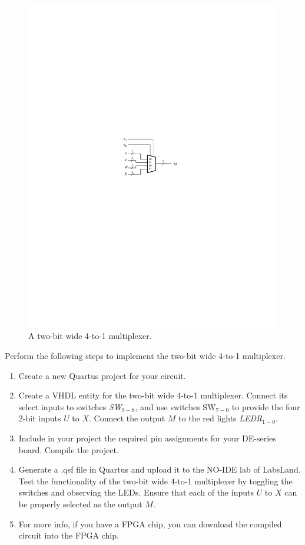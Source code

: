 \documentclass[epsfig,10pt,fullpage]{article}
\begin{document}
\begin{figure}[H]
	\begin{center}
		\includegraphics[]{figures/figure5.pdf}
	\end{center}
\caption{A two-bit wide 4-to-1 multiplexer.}
\label{fig:5}
\end{figure}

Perform the following steps to implement the two-bit wide 4-to-1 multiplexer.
\begin{enumerate}
\item Create a new Quartus project for your circuit.
\item Create a VHDL entity for the two-bit wide 4-to-1 multiplexer. Connect its select
inputs to switches {\it SW}$_{9-8}$, and use switches SW$_{7-0}$ to
provide the four 2-bit inputs $U$ to $X$. Connect the 
output $M$ to the red lights {\it LEDR}$_{1-0}$.
\item Include in your project the required pin assignments for your DE-series board.
Compile the project.
\item Generate a .qsf file in Quartus and upload it to the NO-IDE lab of LabsLand. Test the functionality of the 
two-bit wide 4-to-1 multiplexer by toggling the switches and observing the LEDs. Ensure
that each of the inputs $U$ to $X$ can be properly selected as the output $M$.
\item For more info, if you have a FPGA chip, you can download the compiled circuit into the FPGA chip.
\end{enumerate}
\end{document}

